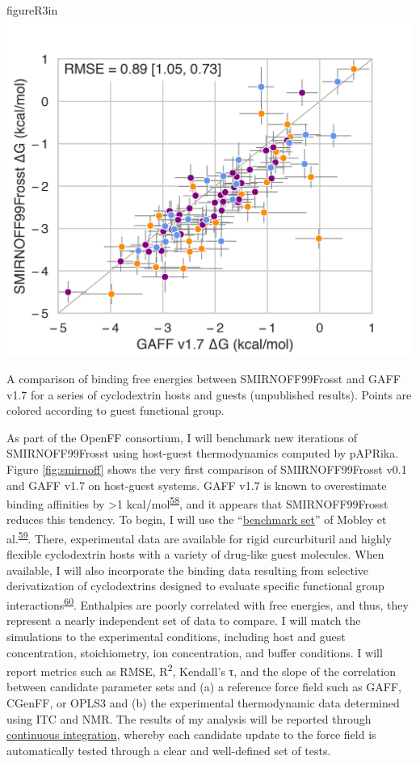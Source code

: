 \documentclass[11pt,notitlepage]{article}
\begin{document}
\begin{wrapfloat}{figure}{R}{3in}
\centering
\includegraphics{content/images/SMIRNOFF-vs-GAFF-deltaG.png}
\caption{A comparison of binding free energies between SMIRNOFF99Frosst
and GAFF v1.7 for a series of cyclodextrin hosts and guests (unpublished
results). Points are colored according to guest functional group.}
\label{fig:smirnoff}
\end{wrapfloat}

As part of the OpenFF consortium, I will benchmark new iterations of
SMIRNOFF99Frosst using host-guest thermodynamics computed by pAPRika.
Figure \ref{fig:smirnoff} shows the very first comparison of
SMIRNOFF99Frosst v0.1 and GAFF v1.7 on host-guest systems. GAFF v1.7 is
known to overestimate binding affinities by \textgreater{}1
kcal/mol\textsuperscript{\protect\hyperlink{ref-HVgz5rZq}{58}}, and it
appears that SMIRNOFF99Frosst reduces this tendency. To begin, I will
use the ``\href{https://escholarship.org/uc/item/9p37m6bq}{benchmark
set}'' of Mobley et
al.\textsuperscript{\protect\hyperlink{ref-12BD3oHp4}{59}}. There,
experimental data are available for rigid curcurbituril and highly
flexible cyclodextrin hosts with a variety of drug-like guest molecules.
When available, I will also incorporate the binding data resulting from
selective derivatization of cyclodextrins designed to evaluate specific
functional group
interactions\textsuperscript{\protect\hyperlink{ref-13gqBX78S}{60}}.
Enthalpies are poorly correlated with free energies, and thus, they
represent a nearly independent set of data to compare. I will match the
simulations to the experimental conditions, including host and guest
concentration, stoichiometry, ion concentration, and buffer conditions.
I will report metrics such as RMSE, R\textsuperscript{2}, Kendall's τ,
and the slope of the correlation between candidate parameter sets and
(a) a reference force field such as GAFF, CGenFF, or OPLS3 and (b) the
experimental thermodynamic data determined using ITC and NMR. The
results of my analysis will be reported through
\href{https://travis-ci.org/openforcefield/openforcefield?branch=master}{continuous
integration}, whereby each candidate update to the force field is
automatically tested through a clear and well-defined set of tests.
\end{document}

